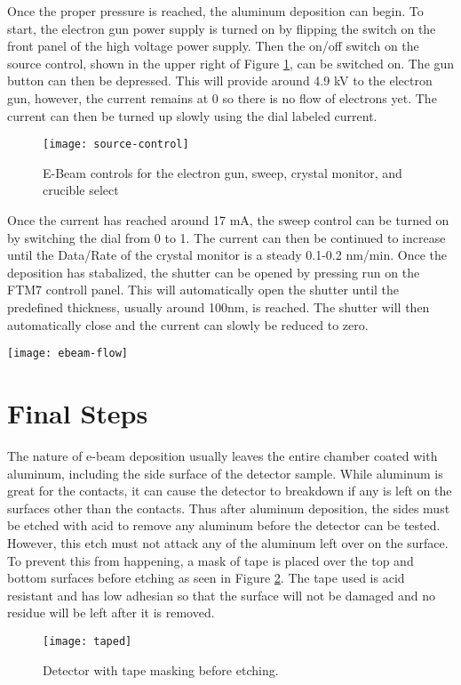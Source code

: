 Once the proper pressure is reached, the aluminum deposition can begin.
To start, the electron gun power supply is turned on by flipping the switch on the front panel of the high voltage power supply.
Then the on/off switch on the source control, shown in the upper right of Figure \ref{fig:source-control}, can be switched on.
The gun button can then be depressed.
This will provide around 4.9 kV to the electron gun, however, the current remains at 0 so there is no flow of electrons yet.
The current can then be turned up slowly using the dial labeled current.
\begin{figure}[htpb]
\centering
\texttt{[image: source-control]}
\caption{E-Beam controls for the electron gun, sweep, crystal monitor, and crucible select}
\label{fig:source-control}
\end{figure}

Once the current has reached around 17 mA, the sweep control can be turned on by switching the dial from 0 to 1.
The current can then be continued to increase until the Data/Rate of the crystal monitor is a steady 0.1-0.2 nm/min.
Once the deposition has stabalized, the shutter can be opened by pressing run on the FTM7 controll panel.
This will automatically open the shutter until the predefined thickness, usually around 100nm, is reached.
The shutter will then automatically close and the current can slowly be reduced to zero.

\begin{sidewaysfigure}
\texttt{[image: ebeam-flow]}
\caption{This is a diagram of the of the electron beam machine.It is used to deposit aluminum onto the detector sample.}
\label{fig:ebeam-flow}
\end{sidewaysfigure}

\section{Final Steps}
The nature of e-beam deposition usually leaves the entire chamber coated with aluminum, including the side surface of the detector sample.
While aluminum is great for the contacts, it can cause the detector to breakdown if any is left on the surfaces other than the contacts.
Thus after aluminum deposition, the sides must be etched with acid to remove any aluminum before the detector can be tested.
However, this etch must not attack any of the aluminum left over on the surface.
To prevent this from happening, a mask of tape is placed over the top and bottom surfaces before etching as seen in Figure \ref{fig:taped}.
The tape used is acid resistant and has low adhesian so that the surface will not be damaged and no residue will be left after it is removed.
\begin{figure}[htpb]
\centering
\texttt{[image: taped]}
\caption{Detector with tape masking before etching.}
\label{fig:taped}
\end{figure}

